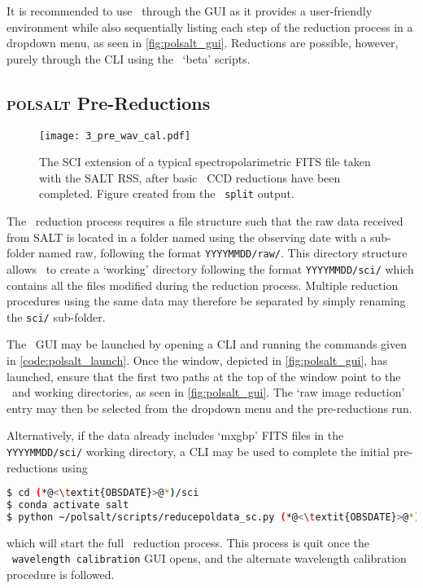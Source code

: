 \pagebreak

It is recommended to use \polsalt\ through the \gls{GUI} as it provides a user-friendly environment while also sequentially listing each step of the reduction process in a dropdown menu, as seen in \autoref{fig:polsalt_gui}. Reductions are possible, however, purely through the \gls{CLI} using the \polsalt\ `beta' scripts.

\subsection{\textsc{polsalt} Pre-Reductions} \label{subsec:reduc_pre}

\begin{figure}[t]
    \centering
    \texttt{[image: 3\_pre\_wav\_cal.pdf]}
    \caption{The \gls{SCI} extension of a typical spectropolarimetric \acs{FITS} file taken with the \gls{SALT} \gls{RSS}, after basic \polsalt\ \gls{CCD} reductions have been completed. Figure created from the \stops\ \texttt{split} output.}
    \label{fig:polsalt_pre_wav_cal}
\end{figure}

The \polsalt\ reduction process requires a file structure such that the raw data received from \gls{SALT} is located in a folder named using the observing date with a sub-folder named raw, following the format \texttt{YYYYMMDD/raw/}. This directory structure allows \polsalt\ to create a `working' directory following the format \texttt{YYYYMMDD/sci/} which contains all the files modified during the reduction process. Multiple reduction procedures using the same data may therefore be separated by simply renaming the \texttt{sci/} sub-folder.

The \polsalt\ \gls{GUI} may be launched by opening a \gls{CLI} and running the commands given in \autoref{code:polsalt_launch}. Once the window, depicted in \autoref{fig:polsalt_gui}, has launched, ensure that the first two paths at the top of the window point to the \polsalt\ and working directories, as seen in \autoref{fig:polsalt_gui}. The `raw image reduction' entry may then be selected from the dropdown menu and the pre-reductions run.

Alternatively, if the data already includes `mxgbp' \gls{FITS} files in the \texttt{YYYYMMDD/sci/} working directory, a \gls{CLI} may be used to complete the initial pre-reductions using
\begin{lstlisting}[language=bash]
$ cd (*@<\textit{OBSDATE}>@*)/sci
$ conda activate salt
$ python ~/polsalt/scripts/reducepoldata_sc.py (*@<\textit{OBSDATE}>@*)
\end{lstlisting}
{\parskip=0pt which} will start the full \polsalt\ reduction process. This process is quit once the \polsalt\ \texttt{wavelength calibration} \gls{GUI} opens, and the alternate wavelength calibration procedure is followed.

